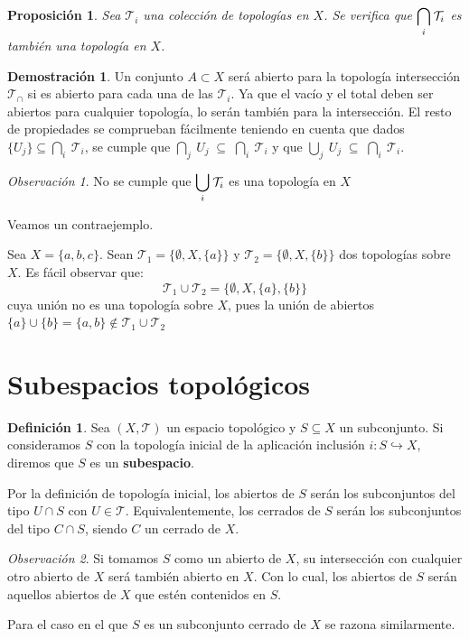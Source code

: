 \documentclass[12pt,twoside]{report}
\newcommand\mc[1]{\mathcal{#1}}
\theoremstyle{azul}
\theoremstyle{azul2}
\theoremstyle{plain}
\newtheorem*{prop}{Proposición}
\theoremstyle{definition}
\newtheorem*{defi}{Definición}
\newtheorem*{dem}{Demostración}
\theoremstyle{remark}
\newtheorem*{obs}{Observación}
\begin{document}
\vspace{7mm}
\begin{prop}
Sea $\mc{T}_i$ una colección de topologías en $X$. Se verifica que $\underset{i}{\mathlarger{\bigcap}} \: \mc{T}_i$ es también una topología en $X$.
\end{prop}
\begin{dem}
Un conjunto $A \subset X$ será abierto para la topología intersección $\mathcal{T}_{\cap}$ si es abierto para cada una de las $\mc{T}_i$. Ya que el vacío y el total deben ser abiertos para cualquier topología, lo serán también para la intersección. El resto de propiedades se comprueban fácilmente teniendo en cuenta que dados $\{U_j\} \subseteq \underset{i}{\bigcap} \: \mc{T}_i$, se cumple que $\underset{j}{\bigcap} \: U_j \;\subseteq\; \underset{i}{\bigcap} \: \mc{T}_i$ y que $\underset{j}{\bigcup} \: U_j \;\subseteq\; \underset{i}{\bigcap} \: \mc{T}_i$.
\end{dem}
\begin{obs}
No se cumple que $\underset{i}{\mathlarger{\bigcup}} \: \mc{T}_i$ es una topología en $X$

Veamos un contraejemplo.

Sea $X=\{a,b,c\}$. Sean $\mc{T}_1=\{\emptyset,X,\{a\}\}$ y $\mc{T}_2=\{\emptyset,X,\{b\}\}$ dos topologías sobre $X$. Es fácil observar que:
$$\mc{T}_1 \cup \mc{T}_2=\{\emptyset,X,\{a\},\{b\}\}$$
cuya unión no es una topología sobre $X$, pues la uni{\'o}n de abiertos $\{a\}\cup\{b\}=\{a,b\} \nin \mc{T}_1 \cup \mc{T}_2$ \label{uniontop}
\end{obs}
\section{Subespacios topológicos}
\begin{defi}
Sea $(X,\mc{T})$ un espacio topológico y $S\subseteq X$ un subconjunto. Si consideramos $S$ con la topología inicial de la aplicación inclusión $i:S\hookrightarrow X$, diremos que $S$ es un \textbf{subespacio}.

Por la definición de topología inicial, los abiertos de $S$ serán los subconjuntos del tipo $U\cap S$ con $U\in \mc{T}$. Equivalentemente, los cerrados de $S$ serán los subconjuntos del tipo $C\cap S$, siendo $C$ un cerrado de $X$.
\end{defi}
\begin{obs}
Si tomamos $S$ como un abierto de $X$, su intersección con cualquier otro abierto de $X$ será también abierto en $X$. Con lo cual, los abiertos de $S$ serán aquellos abiertos de $X$ que estén contenidos en $S$. 

Para el caso en el que $S$ es un subconjunto cerrado de $X$ se razona similarmente.
\end{obs}
\end{document}
